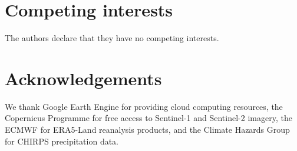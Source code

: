 \documentclass[12pt, a4paper]{article}
\newcommand{\competinginterests}{\section*{Competing interests}}
\newcommand{\acknowledgements}{\section*{Acknowledgements}}
\begin{document}
\competinginterests
The authors declare that they have no competing interests.

\acknowledgements
We thank Google Earth Engine for providing cloud computing resources, the
Copernicus Programme for free access to Sentinel-1 and Sentinel-2 imagery,
the ECMWF for ERA5-Land reanalysis products, and the Climate Hazards Group
for CHIRPS precipitation data.



\end{document}
